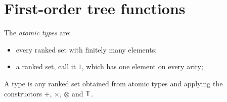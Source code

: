 
\section{First-order tree functions}

\begin{definition}[Types] The \emph{atomic types} are:
    \begin{itemize}
        \item every ranked set with finitely many elements;
        \item a ranked set, call it  $1$, which has one element on every arity;
    \end{itemize}
    A type is any ranked set obtained from atomic types and applying the constructors $+$, $\times$, $\otimes$ and $\mathsf T$.
\end{definition}
    




